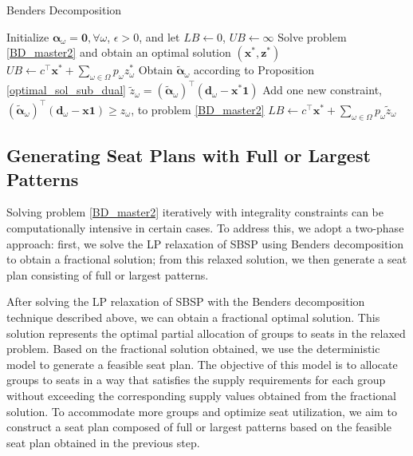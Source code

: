 \begin{algorithm}[ht]
  \caption{Benders Decomposition}\label{cut_algo}
  Initialize $\bm{\alpha}_{\omega} = \mathbf{0}, \forall \omega$, $\epsilon >0$, and let $LB \gets 0$, $UB \gets \infty$\;
    {Solve problem \eqref{BD_master2} and obtain an optimal solution $(\mathbf{x}^{*}, \mathbf{z}^{*})$\;
    $UB \gets c^{\intercal} \mathbf{x}^{*} + \sum_{\omega \in \Omega} p_{\omega} z_{\omega}^{*}$\;
    {Obtain $\bm{\tilde{\alpha}}_{\omega}$ according to Proposition \ref{optimal_sol_sub_dual}\; $\tilde{z}_{\omega}= (\bm{\tilde{\alpha}}_{\omega})^{\intercal}(\mathbf{d}_{\omega}- \mathbf{x}^{*} \mathbf{1})$\;
    {Add one new constraint, $(\bm{\tilde{\alpha}}_{\omega})^{\intercal}(\mathbf{d}_{\omega}- \mathbf{x} \mathbf{1}) \geq z_{\omega}$, to problem \eqref{BD_master2}\;}
    }
    {$LB \gets c^{\intercal} \mathbf{x}^{*} + \sum_{\omega \in \Omega} p_{\omega} \tilde{z}_{\omega} $\;}
    }
\end{algorithm}

\subsection{Generating Seat Plans with Full or Largest Patterns}\label{seat_assignment}
Solving problem \eqref{BD_master2} iteratively with integrality constraints can be computationally intensive in certain cases. To address this, we adopt a two-phase approach: first, we solve the LP relaxation of SBSP using Benders decomposition to obtain a fractional solution; from this relaxed solution, we then generate a seat plan consisting of full or largest patterns.

After solving the LP relaxation of SBSP with the Benders decomposition technique described above, we can obtain a fractional optimal solution. This solution represents the optimal partial allocation of groups to seats in the relaxed problem. Based on the fractional solution obtained, we use the deterministic model to generate a feasible seat plan. The objective of this model is to allocate groups to seats in a way that satisfies the supply requirements for each group without exceeding the corresponding supply values obtained from the fractional solution. To accommodate more groups and optimize seat utilization, we aim to construct a seat plan composed of full or largest patterns based on the feasible seat plan obtained in the previous step.


